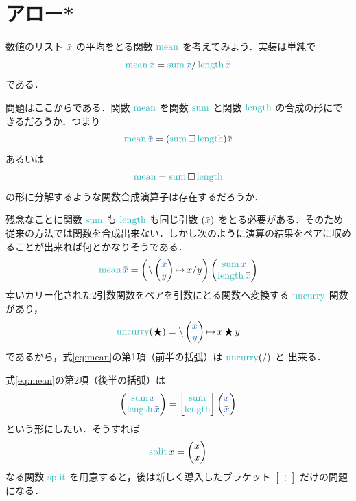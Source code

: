 \documentclass[a5paper,twoside,fleqn,draft]{jsbook}
\begin{document}
\section{アロー*}

数値のリスト $\hListVarWith{x}$ の平均をとる関数 $\mMean$ を考えてみよう．実装は単純で
\begin{equation}
  \mMean\hListVarWith{x}
  =\mSum\hListVarWith{x}/\mLength\hListVarWith{x}
\end{equation}
である．

問題はここからである．関数 $\mMean$ を関数 $\mSum$ と関数 $\mLength$ の合成の形にできるだろうか．つまり
\begin{equation}
  \mMean\hListVarWith{x}
  =(\mSum\mSomeOp\mLength)\hListVarWith{x}
\end{equation}
あるいは
\begin{equation}
  \mMean
  =\mSum\mSomeOp\mLength
\end{equation}
の形に分解するような関数合成演算子は存在するだろうか．

残念なことに関数 $\mSum$ も $\mLength$ も同じ引数 $(\hListVarWith{x})$ をとる必要がある．そのため従来の方法では関数を合成出来ない．しかし次のように演算の結果をペアに収めることが出来れば何とかなりそうである．
\begin{equation}
  \label{eq:mean}
  \mMean\hListVarWith{x}
  =
  \left(\mLambda\hPairWith{\hVar{x}}{\hVar{y}}\mLambdaArrow x/y\right)\hPairWith{\mSum\hListVarWith{x}}{\mLength\hListVarWith{x}}
\end{equation}
幸いカリー化された2引数関数をペアを引数にとる関数へ変換する
$\hUncurry$ 関数があり，
\begin{equation}
  \hUncurry(\hAnyBinOp)
  =\mLambda\hPairWith{\hVar{x}}{\hVar{y}}\mLambdaArrow x\hAnyBinOp y
\end{equation}
であるから，式\eqref{eq:mean}の第1項（前半の括弧）は $\hUncurry(/)$ と
出来る．

式\eqref{eq:mean}の第2項（後半の括弧）は
\begin{equation}
  \hPairWith{\mSum\hListVarWith{x}}{\mLength\hListVarWith{x}}
  =\begin{bmatrix}
  \mSum\\
  \mLength
  \end{bmatrix}
  \hPairWith{\hListVarWith{x}}{\hListVarWith{x}}
\end{equation}
という形にしたい．そうすれば
\begin{equation}
  \mSplit x
  =\hPairWith{x}{x}
\end{equation}
なる関数 $\mSplit$ を用意すると，後は新しく導入したブラケット
$\begin{bmatrix}\vdots\end{bmatrix}$ だけの問題になる．
\end{document}
